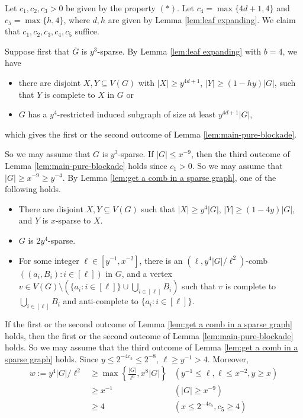 \documentclass[a4paper,11pt]{article}
\let\oldendproof\endproof
\renewenvironment{proof}[1][\proofname]{%
	\oldproof[\normalfont\bfseries #1]%
}{\oldendproof}
\begin{document}
    \begin{proof}
        Let $c_1,c_2,c_3>0$ be given by the property $(*)$. 
        Let $c_4=\max\{4d+1,4\}$ and  $c_5=\max\{h,4\}$, where $d,h$ are given by Lemma \ref{lem:leaf expanding}. 
        We claim that $c_1,c_2,c_3,c_4,c_5$ suffice.

        Suppose first that $\overline{G}$ is $y^3$-sparse.
        By Lemma \ref{lem:leaf expanding} with $b=4$, we have 
        \begin{itemize}
            \item there are disjoint $X,Y\subseteq V(G)$ with $|X|\geq y^{4d+1}$, $|Y|\geq (1-hy)|G|$, such that $Y$ is complete to $X$ in $G$ or
            
            \item $G$ has a $y^4$-restricted induced subgraph of size at least $y^{4d+1}|G|$,  
        \end{itemize}
        which gives the first or the second outcome of Lemma \ref{lem:main-pure-blockade}. 
        
        So we may assume that $G$ is $y^3$-sparse. If $|G|\leq x^{-9}$, then the third outcome of Lemma \ref{lem:main-pure-blockade} holds since $c_1>0$. 
        So we may assume that $|G|\geq x^{-9}\geq y^{-4}$. 
        By Lemma \ref{lem:get a comb in a sparse graph}, one of the following holds.
        \begin{itemize}
        \item There are disjoint $X,Y\subseteq V(G)$ such that $|X|\geq y^4|G|$, $|Y|\geq (1-4y)|G|$, and $Y$ is $x$-sparse to $X$.
        
        \item $G$ is $2y^4$-sparse.
        
        \item For some integer $\ell\in[y^{-1},x^{-2}]$, there is an $(\ell, y^4|G|/\ell^2)$-comb $((a_i,B_i):i\in[\ell])$ in $G$, and a vertex $v\in V(G)\setminus(\{a_i:i\in[\ell]\}\cup\bigcup_{i\in[\ell]}B_i)$ such that $v$ is complete to $\bigcup_{i\in[\ell]}B_i$ and anti-complete to $\{a_i:i\in[\ell]\}$.
        \end{itemize}
        If the first or the second outcome of Lemma \ref{lem:get a comb in a sparse graph} holds, then the first or the second outcome of Lemma \ref{lem:main-pure-blockade} holds. 
        So we may assume that the third outcome of Lemma \ref{lem:get a comb in a sparse graph} holds.         
        Since $y\leq 2^{-4c_5}\leq 2^{-8}$, $\ell\geq y^{-1}> 4$. Moreover,
        \begin{align*}
        w:=y^4|G|/\ell^2 & \geq \max\left\{\frac{|G|}{\ell^6},x^8|G|\right\} & (y^{-1}\leq \ell, \ell\leq x^{-2}, y\geq x) \\
            & \geq x^{-1} & (|G|\geq x^{-9})\\
            & \geq 4 & (x\leq 2^{-4c_5},c_5\geq 4)
        \end{align*}
  

\end{proof}
\end{document}
